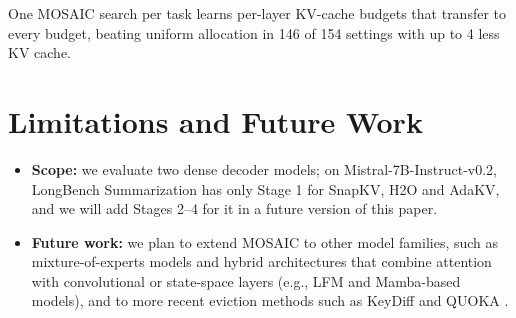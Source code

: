 \documentclass[11pt]{article}
\begin{document}
One MOSAIC search per task learns per-layer KV-cache budgets that transfer to every budget, beating uniform allocation in 146 of 154 settings with up to 4\texttimes{} less KV cache.

\clearpage
\section*{Limitations and Future Work}

\begin{itemize}
\item \textbf{Scope:} we evaluate two dense decoder models; on Mistral-7B-Instruct-v0.2, LongBench Summarization has only Stage 1 for SnapKV, H2O and AdaKV, and we will add Stages 2--4 for it in a future version of this paper.
\item \textbf{Future work:} we plan to extend MOSAIC to other model families, such as mixture-of-experts models and hybrid architectures that combine attention with convolutional or state-space layers (e.g., LFM and Mamba-based models), and to more recent eviction methods such as KeyDiff \citep{park2025keydiff} and QUOKA \citep{jones2026quoka}.
\end{itemize}

\FloatBarrier




\end{document}
